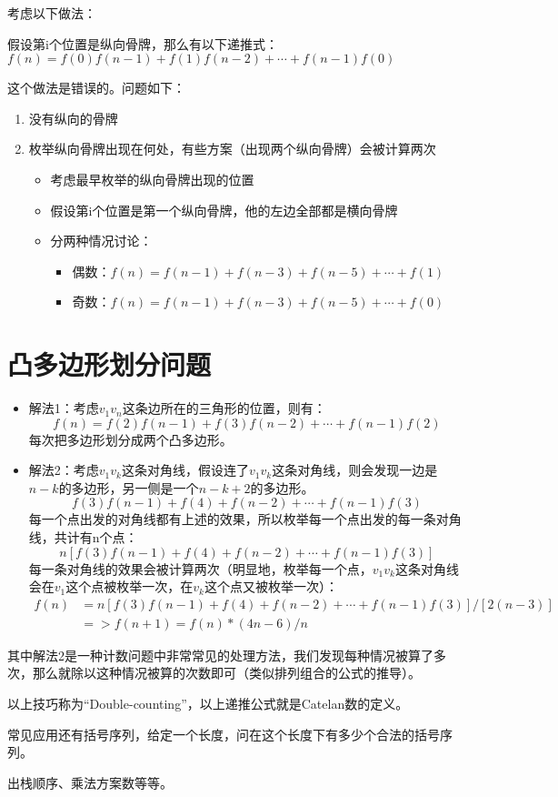 \documentclass{article}
\begin{document}
考虑以下做法：

假设第i个位置是纵向骨牌，那么有以下递推式：
$f(n)=f(0)f(n-1)+f(1)f(n-2)+\cdots+f(n-1)f(0)$

这个做法是错误的。问题如下：
\begin{enumerate}
  \item{没有纵向的骨牌}
  \item{枚举纵向骨牌出现在何处，有些方案（出现两个纵向骨牌）会被计算两次}
  \begin{itemize}
    \item{考虑最早枚举的纵向骨牌出现的位置}
    \item{假设第i个位置是第一个纵向骨牌，他的左边全部都是横向骨牌}
    \item{分两种情况讨论：}
    \begin{itemize}
      \item{偶数：$f(n)=f(n-1)+f(n-3)+f(n-5)+\cdots+f(1)$}
      \item{奇数：$f(n)=f(n-1)+f(n-3)+f(n-5)+\cdots+f(0)$}
    \end{itemize}
  \end{itemize}
\end{enumerate}
\section{凸多边形划分问题}
\begin{itemize}
    \item{解法1：考虑$v_1v_n$这条边所在的三角形的位置，则有：
    \begin{equation*}
      f(n)=f(2)f(n-1)+f(3)f(n-2)+\cdots+f(n-1)f(2)
    \end{equation*}
    每次把多边形划分成两个凸多边形。}
    \item{解法2：考虑$v_1v_k$这条对角线，假设连了$v_1v_k$这条对角线，则会发现一边是$n-k$的多边形，另一侧是一个$n-k+2$的多边形。
    \begin{equation*}
      f(3)f(n-1)+f(4)+f(n-2)+\cdots+f(n-1)f(3)
    \end{equation*}
    每一个点出发的对角线都有上述的效果，所以枚举每一个点出发的每一条对角线，共计有n个点：
    \begin{equation*}
      n[f(3)f(n-1)+f(4)+f(n-2)+\cdots+f(n-1)f(3)]
    \end{equation*}
    每一条对角线的效果会被计算两次（明显地，枚举每一个点，$v_1v_k$这条对角线会在$v_1$这个点被枚举一次，在$v_k$这个点又被枚举一次）：
    \begin{equation*}
      \begin{aligned}
        f(n)&=n[f(3)f(n-1)+f(4)+f(n-2)+\cdots+f(n-1)f(3)]/[2(n-3)]\\
        &=>f(n+1)=f(n)*(4n-6)/n
      \end{aligned}
    \end{equation*}
    }
\end{itemize}
其中解法2是一种计数问题中非常常见的处理方法，我们发现每种情况被算了多次，那么就除以这种情况被算的次数即可（类似排列组合的公式的推导）。

以上技巧称为``Double-counting''，以上递推公式就是Catelan数的定义。

常见应用还有括号序列，给定一个长度，问在这个长度下有多少个合法的括号序列。

出栈顺序、乘法方案数等等。
\end{document}
